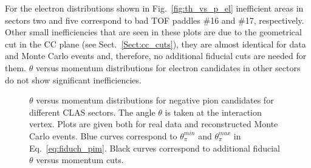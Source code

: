 For the electron distributions shown in Fig.~\ref{fig:th_vs_p_el} inefficient areas in sectors two and five correspond to bad TOF paddles \#16 and \#17, respectively. Other small inefficiencies that are seen in these plots are due to the geometrical cut in the CC plane (see Sect.~\ref{Sect:cc_cuts}), they are almost identical for data and Monte Carlo events and, therefore, no additional fiducial cuts are needed for them.  $\theta$ versus momentum distributions for electron candidates in other sectors do not show significant inefficiencies. 




\begin{figure}[htp]
\begin{center}
\caption{\small $\theta$ versus momentum distributions for negative pion candidates for different CLAS sectors. The angle $\theta$ is taken at the interaction vertex. Plots are given both for real data and reconstructed Monte Carlo events. Blue curves correspond to $\theta_{\pi}^{min}$ and $\theta_{\pi}^{max}$ in Eq.~\eqref{eq:fiduch_pim}. Black curves correspond to additional fiducial $\theta$ versus momentum cuts. \label{fig:th_vs_p_pim}}
\end{center}
\end{figure}


